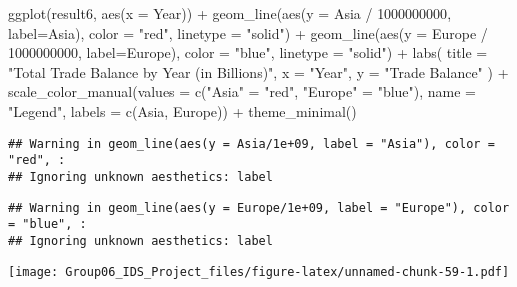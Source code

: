 \documentclass[
]{article}
\newenvironment{Shaded}{\begin{snugshade}}{\end{snugshade}}
\newcommand{\AttributeTok}[1]{\textcolor[rgb]{0.77,0.63,0.00}{#1}}
\newcommand{\DecValTok}[1]{\textcolor[rgb]{0.00,0.00,0.81}{#1}}
\newcommand{\FunctionTok}[1]{\textcolor[rgb]{0.00,0.00,0.00}{#1}}
\newcommand{\NormalTok}[1]{#1}
\newcommand{\OtherTok}[1]{\textcolor[rgb]{0.56,0.35,0.01}{#1}}
\newcommand{\SpecialCharTok}[1]{\textcolor[rgb]{0.00,0.00,0.00}{#1}}
\newcommand{\StringTok}[1]{\textcolor[rgb]{0.31,0.60,0.02}{#1}}
\begin{document}
\begin{Shaded}
\begin{Highlighting}[]
\FunctionTok{ggplot}\NormalTok{(result6, }\FunctionTok{aes}\NormalTok{(}\AttributeTok{x =}\NormalTok{ Year)) }\SpecialCharTok{+}
  \FunctionTok{geom\_line}\NormalTok{(}\FunctionTok{aes}\NormalTok{(}\AttributeTok{y =}\NormalTok{ Asia }\SpecialCharTok{/} \DecValTok{1000000000}\NormalTok{, }\AttributeTok{label=}\StringTok{\textquotesingle{}Asia\textquotesingle{}}\NormalTok{), }\AttributeTok{color =} \StringTok{"red"}\NormalTok{, }\AttributeTok{linetype =} \StringTok{"solid"}\NormalTok{) }\SpecialCharTok{+}
  \FunctionTok{geom\_line}\NormalTok{(}\FunctionTok{aes}\NormalTok{(}\AttributeTok{y =}\NormalTok{ Europe }\SpecialCharTok{/} \DecValTok{1000000000}\NormalTok{, }\AttributeTok{label=}\StringTok{\textquotesingle{}Europe\textquotesingle{}}\NormalTok{), }\AttributeTok{color =} \StringTok{"blue"}\NormalTok{, }\AttributeTok{linetype =} \StringTok{"solid"}\NormalTok{) }\SpecialCharTok{+}
  \FunctionTok{labs}\NormalTok{(}
    \AttributeTok{title =} \StringTok{"Total Trade Balance by Year (in Billions)"}\NormalTok{,}
    \AttributeTok{x =} \StringTok{"Year"}\NormalTok{,}
    \AttributeTok{y =} \StringTok{"Trade Balance"}
\NormalTok{  ) }\SpecialCharTok{+}
  \FunctionTok{scale\_color\_manual}\NormalTok{(}\AttributeTok{values =} \FunctionTok{c}\NormalTok{(}\StringTok{"Asia"} \OtherTok{=} \StringTok{"red"}\NormalTok{, }\StringTok{"Europe"} \OtherTok{=} \StringTok{"blue"}\NormalTok{),}
                     \AttributeTok{name =} \StringTok{"Legend"}\NormalTok{,}
                     \AttributeTok{labels =} \FunctionTok{c}\NormalTok{(}\StringTok{\textquotesingle{}Asia\textquotesingle{}}\NormalTok{, }\StringTok{\textquotesingle{}Europe\textquotesingle{}}\NormalTok{)) }\SpecialCharTok{+}
  \FunctionTok{theme\_minimal}\NormalTok{()}
\end{Highlighting}
\end{Shaded}

\begin{verbatim}
## Warning in geom_line(aes(y = Asia/1e+09, label = "Asia"), color = "red", :
## Ignoring unknown aesthetics: label
\end{verbatim}

\begin{verbatim}
## Warning in geom_line(aes(y = Europe/1e+09, label = "Europe"), color = "blue", :
## Ignoring unknown aesthetics: label
\end{verbatim}

\texttt{[image: Group06\_IDS\_Project\_files/figure-latex/unnamed-chunk-59-1.pdf]}
\end{document}
